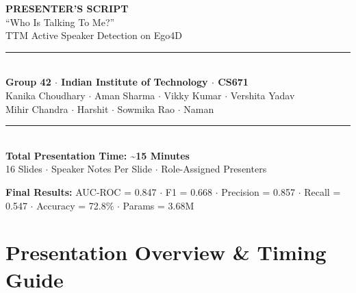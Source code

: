 \documentclass[11pt, a4paper]{article}
\begin{document}

\begin{titlepage}
\pagecolor{NavyBlue}
\color{white}
\vspace*{2cm}
\begin{center}
{\Huge\bfseries PRESENTER'S SCRIPT}\\[0.4cm]
{\Large\color{AccBlue!70!white} ``Who Is Talking To Me?''}\\[0.2cm]
{\large TTM Active Speaker Detection on Ego4D}\\[0.5cm]
{\color{AccOrange}\rule{10cm}{1pt}}\\[0.4cm]
{\bfseries\large Group 42 $\cdot$ Indian Institute of Technology $\cdot$ CS671}\\[0.3cm]
{\normalsize Kanika Choudhary $\cdot$ Aman Sharma $\cdot$ Vikky Kumar $\cdot$ Vershita Yadav}\\
{\normalsize Mihir Chandra $\cdot$ Harshit $\cdot$ Sowmika Rao $\cdot$ Naman}\\[0.6cm]
{\color{AccOrange}\rule{10cm}{1pt}}\\[0.4cm]
{\large\bfseries Total Presentation Time: \textasciitilde 15 Minutes}\\[0.2cm]
{\normalsize 16 Slides $\cdot$ Speaker Notes Per Slide $\cdot$ Role-Assigned Presenters}
\end{center}
\vfill
\begin{center}
{\small\color{AccBlue!60!white}
\textbf{Final Results:}
AUC-ROC = 0.847 $\cdot$
F1 = 0.668 $\cdot$
Precision = 0.857 $\cdot$
Recall = 0.547 $\cdot$
Accuracy = 72.8\% $\cdot$
Params = 3.68M
}
\end{center}
\end{titlepage}
\nopagecolor

\newpage
\section*{\color{NavyBlue}Presentation Overview \& Timing Guide}

\vspace{0.3cm}
\end{document}
